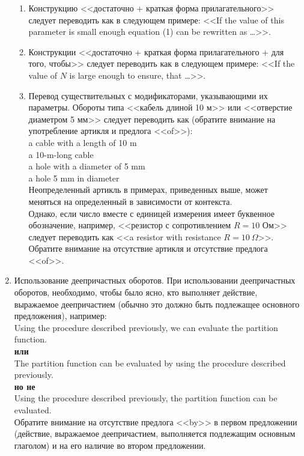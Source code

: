 \documentclass[a5paper, 10pt, twoside, numbers=enddot]{scrartcl}
\begin{document}
\begin{enumerate}
\begin{enumerate}
      \item Конструкцию <<достаточно + краткая форма прилагательного>> следует переводить как в
        следующем примере: <<If the value of this parameter is small enough equation (1) can be
        rewritten as \ldots>>.

      \item Конструкции <<достаточно + краткая форма прилагательного + для того, чтобы>> следует
        переводить как в следующем примере: <<If the value of $N$ is large enough to ensure, that
        \ldots>>.

      \item Перевод существительных с модификаторами, указывающими их параметры. Обороты типа
        <<кабель длиной 10 м>> или <<отверстие диаметром 5 мм>> следует переводить как (обратите
        внимание на употребление артикля и предлога <<of>>):\\ [4pt]
        \textsf{
          a cable with a length of 10 m\\
          a 10-m-long cable\\
          a hole with a diameter of 5 mm\\
          a hole 5 mm in diameter\\ [4pt]
        }
        Неопределенный артикль в примерах, приведенных выше, может меняться на определенный в
        зависимости от контекста.\\ [4pt]
        Однако, если число вместе с единицей измерения имеет буквенное обозначение, например,
        <<резистор с сопротивлением $R=10$ Ом>> следует переводить как <<a resistor with
        resistance $R=10\ \Omega$>>. Обратите внимание на отсутствие артикля и отсутствие предлога
        <<of>>.
    \end{enumerate}

  \item Использование деепричастных оборотов. При использовании деепричастных оборотов, необходимо,
    чтобы было ясно, кто выполняет действие, выражаемое деепричастием (обычно это должно быть
    подлежащее основного предложения), например:\\ [4pt]
    \textsf{
      Using the procedure described previously, we can evaluate the partition function.\\ [4pt]
      \textbf{или}\\ [4pt]
      The partition function can be evaluated by using the procedure described previously.\\ [4pt]
      \textbf{но не}\\ [4pt]
      Using the procedure described previously, the partition function can be evaluated.\\ [4pt]
    }
    Обратите внимание на отсутствие предлога <<by>> в первом предложении (действие, выражаемое
    деепричастием, выполняется подлежащим основным глаголом) и на его наличие во втором предложении.


\end{enumerate}
\end{document}
